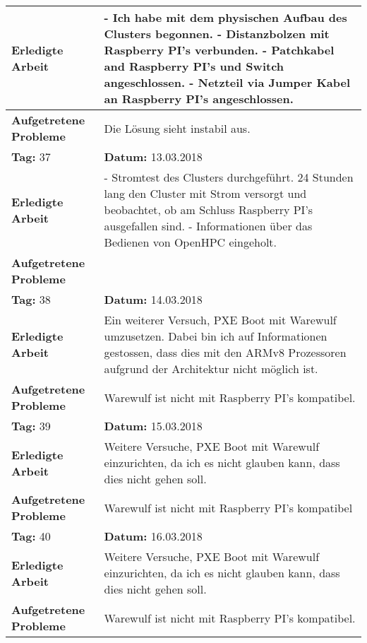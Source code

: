 \begin{longtable}{|p{5cm}|p{5cm}p{6cm}|}
\textbf{Erledigte Arbeit} & \multicolumn{2}{p{11cm}|}{- Ich habe mit dem physischen Aufbau des Clusters begonnen. \newline
- Distanzbolzen mit Raspberry PI's verbunden. \newline
- Patchkabel and Raspberry PI's und Switch angeschlossen. \newline
- Netzteil via Jumper Kabel an Raspberry PI's angeschlossen.} \\ \hline
\textbf{Aufgetretene Probleme} & \multicolumn{2}{p{11cm}|}{Die Lösung sieht instabil aus.} \\ \hline
\rowcolor{heading}\textbf{Tag:} 37 & \textbf{Datum:} 13.03.2018 & \\ \hline
\textbf{Erledigte Arbeit} & \multicolumn{2}{p{11cm}|}{- Stromtest des Clusters durchgeführt. 24 Stunden lang den Cluster mit Strom versorgt und beobachtet, ob am Schluss Raspberry PI's ausgefallen sind. \newline
- Informationen über das Bedienen von OpenHPC eingeholt.} \\ \hline
\textbf{Aufgetretene Probleme} & \multicolumn{2}{p{11cm}|}{} \\ \hline
\rowcolor{heading}\textbf{Tag:} 38 & \textbf{Datum:} 14.03.2018 & \\ \hline
\textbf{Erledigte Arbeit} & \multicolumn{2}{p{11cm}|}{Ein weiterer Versuch, PXE Boot mit Warewulf umzusetzen. Dabei bin ich auf Informationen gestossen, dass dies mit den ARMv8 Prozessoren aufgrund der Architektur nicht möglich ist.} \\ \hline
\textbf{Aufgetretene Probleme} & \multicolumn{2}{p{11cm}|}{Warewulf ist nicht mit Raspberry PI's kompatibel.} \\ \hline
\rowcolor{heading}\textbf{Tag:} 39 & \textbf{Datum:} 15.03.2018 & \\ \hline
\textbf{Erledigte Arbeit} & \multicolumn{2}{p{11cm}|}{Weitere Versuche, PXE Boot mit Warewulf einzurichten, da ich es nicht glauben kann, dass dies nicht gehen soll.} \\ \hline
\textbf{Aufgetretene Probleme} & \multicolumn{2}{p{11cm}|}{Warewulf ist nicht mit Raspberry PI's kompatibel} \\ \hline
\rowcolor{heading}\textbf{Tag:} 40 & \textbf{Datum:} 16.03.2018 & \\ \hline
\textbf{Erledigte Arbeit} & \multicolumn{2}{p{11cm}|}{Weitere Versuche, PXE Boot mit Warewulf einzurichten, da ich es nicht glauben kann, dass dies nicht gehen soll.} \\ \hline
\textbf{Aufgetretene Probleme} & \multicolumn{2}{p{11cm}|}{Warewulf ist nicht mit Raspberry PI's kompatibel.} \\ \hline

\end{longtable}
